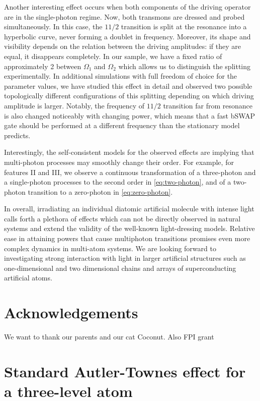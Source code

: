 \documentclass[%
 pra,
 amsmath,amssymb,
 reprint,%
]{revtex4-1}
\begin{document}
Another interesting effect occurs when both components of the driving operator are in the single-photon regime. Now, both transmons are dressed and probed simultaneously. In this case, the $11/2$ transition is split at the resonance into a hyperbolic curve, never forming a doublet in frequency. Moreover, its shape and visibility depends on the relation between the driving amplitudes: if they are equal, it disappears completely. In our sample, we have a fixed ratio of approximately 2 between $\Omega_1$ and $\Omega_2$ which allows us to distinguish the splitting experimentally. In additional simulations with full freedom of choice for the parameter values, we have studied this effect in detail and observed two possible topologically different configurations of this splitting depending on which driving amplitude is larger. Notably, the frequency of $11/2$ transition far from resonance is also changed noticeably with changing power, which means that a fast bSWAP gate should be performed at a different frequency than the stationary model predicts. 

Interestingly, the self-consistent models for the observed effects are implying that multi-photon processes may smoothly change their order. For example, for features II and III, we observe a continuous transformation of a three-photon and a single-photon processes to the second order in \eqref{eq:two-photon}, and of a two-photon transition to a zero-photon in \eqref{eq:zero-photon}.

In overall, irradiating an individual diatomic artificial molecule with intense light calls forth a plethora of effects which can not be directly observed in natural systems and extend the validity of the well-known light-dressing models. Relative ease in attaining powers that cause multiphoton transitions promises even more complex dynamics in multi-atom systems. We are looking forward to investigating strong interaction with light in larger artificial structures such as one-dimensional and two dimensional chains and arrays of superconducting artificial atoms.

\section{Acknowledgements}

We want to thank our parents and our cat Coconut. Also FPI grant

\appendix

\section{Standard Autler-Townes effect for a three-level atom} \label{sec:3-level-at}
\end{document}

